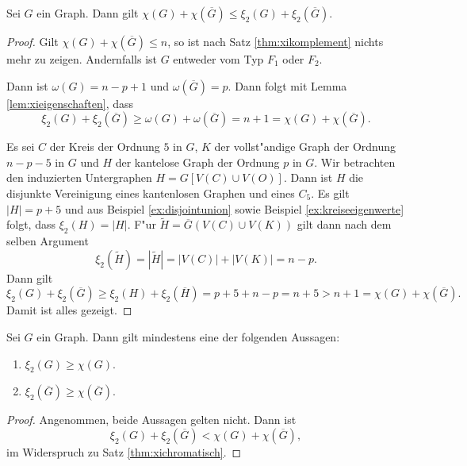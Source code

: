   \begin{theorem}
    Sei $G$ ein Graph. Dann gilt $\chi(G) + \chi(\overline{G}) \leq \xi_{2}(G) +  \xi_{2}(\overline{G})$.
    \label{thm:xichromatisch}
  \end{theorem}
  \begin{proof}
    Gilt $\chi(G) + \chi(\overline{G}) \leq n$, so ist nach Satz \ref{thm:xikomplement} nichts mehr zu zeigen. Andernfalls ist $G$ entweder vom Typ $F_1$ oder $F_2$. 

     Dann ist $\omega(G) = n-p+1$ und $\omega (\overline{G})=p$. Dann folgt mit Lemma \ref{lem:xieigenschaften}, dass 
    $$\xi_{2}(G) + \xi_{2}(\overline{G}) \geq \omega(G) + \omega(\overline{G}) = n+ 1 = \chi(G) + \chi(\overline{G}).$$

     Es sei $C$ der Kreis der Ordnung $5$ in $G$, $K$ der vollst"andige Graph der Ordnung $n-p-5$ in $G$ und $H$ der kantelose Graph der Ordnung $p$ in $G$. Wir betrachten den induzierten Untergraphen $H=G[V(C) \cup V(O)]$. Dann ist $H$ die disjunkte Vereinigung eines kantenlosen Graphen und eines $C_5$. Es gilt $|H| = p+5$ und aus Beispiel \ref{ex:disjointunion} sowie Beispiel \ref{ex:kreiseeigenwerte} folgt, dass $\xi_{2}(H) = |H|$. 
    F"ur $\tilde{H} = \overline{G} (V(C) \cup V(K))$ gilt dann nach dem selben Argument $$\xi_{2}(\tilde{H}) = |\tilde{H}| = |V(C)| + |V(K)| = n-p .$$ Dann gilt 
    $$\xi_{2}(G) + \xi_{2}(\overline{G}) \geq \xi_{2}(H) + \xi_{2}(\overline{H}) = p+5 + n -p = n+ 5 > n+ 1 = \chi(G) + \chi(\overline{G}).$$
    Damit ist alles gezeigt.
  \end{proof}

  \begin{corollary}
    Sei $G$ ein Graph. Dann gilt mindestens eine der folgenden Aussagen:
    \begin{enumerate}[label=\rm{(\alph*)}]
      \item $\xi_2(G) \geq \chi(G)$.
      \item $\xi_{2}(\overline{G}) \geq \chi(\overline{G})$.
    \end{enumerate}
  \end{corollary}

  \begin{proof}
    Angenommen, beide Aussagen gelten nicht. Dann ist 
    $$\xi_2(G) + \xi_{2}(\overline{G}) < \chi(G) + \chi(\overline{G}), $$
    im Widerspruch zu Satz \ref{thm:xichromatisch}.
  \end{proof}

